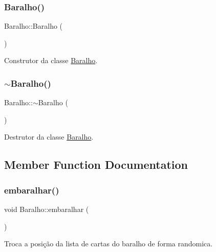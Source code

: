 \subsubsection{\texorpdfstring{Baralho()}{Baralho()}}
{\footnotesize\ttfamily Baralho\+::\+Baralho (\begin{DoxyParamCaption}{ }\end{DoxyParamCaption})}



Construtor da classe \mbox{\hyperlink{class_baralho}{Baralho}}. 

\mbox{\label{class_baralho_ae6732f805c72b2983255fc813b2d0422}} 
\subsubsection{\texorpdfstring{$\sim$Baralho()}{~Baralho()}}
{\footnotesize\ttfamily Baralho\+::$\sim$\+Baralho (\begin{DoxyParamCaption}{ }\end{DoxyParamCaption})}



Destrutor da classe \mbox{\hyperlink{class_baralho}{Baralho}}. 



\subsection{Member Function Documentation}
\mbox{\label{class_baralho_a702ae6b1313a49896f202ab6eec709a8}} 
\subsubsection{\texorpdfstring{embaralhar()}{embaralhar()}}
{\footnotesize\ttfamily void Baralho\+::embaralhar (\begin{DoxyParamCaption}{ }\end{DoxyParamCaption})}



Troca a posição da lista de cartas do baralho de forma randomica. 

\mbox{\label{class_baralho_aa8c0c91bec112680c071abb586e8fd71}} 
